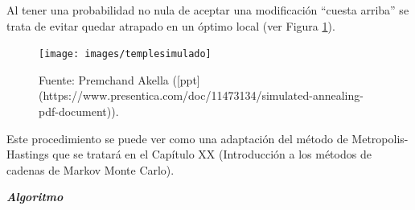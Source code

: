 \documentclass[
]{book}
\theoremstyle{break}
\theoremstyle{nonumberplain}
\begin{document}
Al tener una probabilidad no nula de aceptar una modificación ``cuesta arriba'' se trata de evitar quedar atrapado en un óptimo local (ver Figura \ref{fig:templesimulado}).

\begin{figure}[!htb]

{\centering \texttt{[image: images/templesimulado]} 

}

\caption{Fuente: Premchand Akella ([ppt](https://www.presentica.com/doc/11473134/simulated-annealing-pdf-document)).}\label{fig:templesimulado}
\end{figure}

Este procedimiento se puede ver como una adaptación del método de Metropolis-Hastings que se tratará en el Capítulo XX (Introducción a los métodos de cadenas de Markov Monte Carlo).

\textbf{\emph{Algoritmo}}
\end{document}

